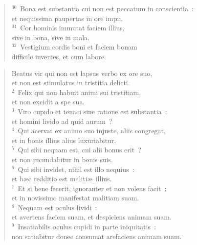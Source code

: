 \begin{flushleft}\begin{verse}${}^{30}$~Bona est substantia cui non est peccatum in conscientia~:\\ et nequissima paupertas in ore impii.\\
${}^{31}$~Cor hominis immutat faciem illius,\\ sive in bona, sive in mala.\\
${}^{32}$~Vestigium cordis boni et faciem bonam\\ difficile invenies, et cum labore.\end{verse}\end{flushleft}


\begin{flushleft}\begin{verse}\vspace{-19pt}\hspace{6pt}Beatus vir qui non est lapsus verbo ex ore suo,\\\hspace{6pt} et non est stimulatus in tristitia delicti.\\
${}^{2}$~Felix qui non habuit animi sui tristitiam,\\ et non excidit a spe sua.\\
${}^{3}$~Viro cupido et tenaci sine ratione est substantia~:\\ et homini livido ad quid aurum~?\\
${}^{4}$~Qui acervat ex animo suo injuste, aliis congregat,\\ et in bonis illius alius luxuriabitur.\\
${}^{5}$~Qui sibi nequam est, cui alii bonus erit~?\\ et non jucundabitur in bonis suis.\\
${}^{6}$~Qui sibi invidet, nihil est illo nequius~:\\ et h\ae c redditio est maliti\ae\ illius.\\
${}^{7}$~Et si bene fecerit, ignoranter et non volens facit~:\\ et in novissimo manifestat malitiam suam.\\
${}^{8}$~Nequam est oculus lividi~:\\ et avertens faciem suam, et despiciens animam suam.\\
${}^{9}$~Insatiabilis oculus cupidi in parte iniquitatis~:\\ non satiabitur donec consumat arefaciens animam suam.\\

\end{verse}
\end{flushleft}
